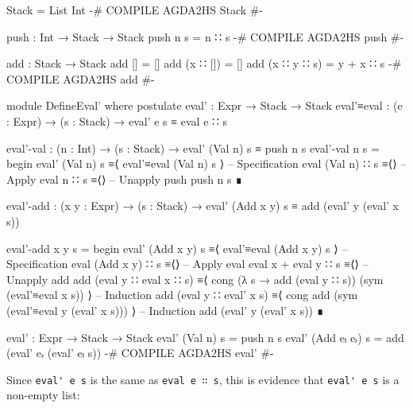 \documentclass{article}
\begin{document}
\begin{code}
Stack = List Int
{-# COMPILE AGDA2HS Stack #-}

push : Int → Stack → Stack
push n s = n ∷ s
{-# COMPILE AGDA2HS push #-}

add : Stack → Stack
add [] = []
add (x ∷ []) = []
add (x ∷ y ∷ s) = y + x ∷ s
{-# COMPILE AGDA2HS add #-}

module DefineEval' where
  postulate
    eval' : Expr → Stack → Stack
    eval'≡eval : (e : Expr) → (s : Stack) → eval' e s ≡ eval e ∷ s

  eval'-val : (n : Int) → (s : Stack) → eval' (Val n) s ≡ push n s
  eval'-val n s =
    begin
      eval' (Val n) s
    ≡⟨ eval'≡eval (Val n) s ⟩ -- Specification
      eval (Val n) ∷ s
    ≡⟨⟩ -- Apply eval
      n ∷ s
    ≡⟨⟩ -- Unapply push
      push n s
    ∎
\end{code}
\begin{code}
  eval'-add : (x y : Expr) → (s : Stack)
    → eval' (Add x y) s ≡ add (eval' y (eval' x s))
\end{code}
\begin{code}
  eval'-add x y s =
    begin
      eval' (Add x y) s
    ≡⟨ eval'≡eval (Add x y) s ⟩ -- Specification
      eval (Add x y) ∷ s
    ≡⟨⟩ -- Apply eval
      eval x + eval y ∷ s
    ≡⟨⟩ -- Unapply add
      add (eval y ∷ eval x ∷ s)
    ≡⟨ cong (λ s → add (eval y ∷ s)) (sym (eval'≡eval x s)) ⟩ -- Induction
      add (eval y ∷ eval' x s)
    ≡⟨ cong add (sym (eval'≡eval y (eval' x s))) ⟩ -- Induction
      add (eval' y (eval' x s))
    ∎
\end{code}
\begin{code}
eval' : Expr → Stack → Stack
eval' (Val n) s = push n s
eval' (Add eₗ eᵣ) s = add (eval' eᵣ (eval' eₗ s))
{-# COMPILE AGDA2HS eval' #-}
\end{code}

\noindent
Since \verb!eval' e s! is the same as \verb!eval e ∷ s!, this is evidence that \verb!eval' e s! is a non-empty list:
\end{document}
